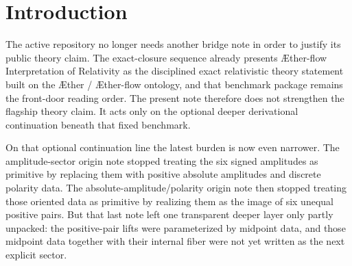 \documentclass[11pt]{article}
\newcommand{\Aether}{\AE{}ther}
\newcommand{\Aflow}{\AE{}ther-flow}
\newcommand{\TheoryName}{\Aflow{} Interpretation of Relativity}
\newcommand{\DeepReadAmp}{\xi_{\mathrm{br}}^{q}}
\newcommand{\DeepCovAmp}{\xi_{\mathrm{br}}^{\varphi}}
\newcommand{\DeepRelaxAmp}{\xi_{\mathrm{br}}^{V}}
\newcommand{\DeepWellAmp}{\zeta_{\mathrm{br}}^{\lambda}}
\newcommand{\DeepEqAmp}{\zeta_{\mathrm{br}}^{U}}
\newcommand{\DeepScaleAmp}{\varsigma_{\mathrm{br}}}
\newcommand{\MidRead}{C_{q}}
\newcommand{\MidCov}{C_{\varphi}}
\newcommand{\MidRelax}{C_{V}}
\newcommand{\MidWell}{C_{\lambda}}
\newcommand{\MidEq}{C_{U}}
\newcommand{\MidScale}{C_{\omega}}
\newcommand{\FiberRead}{\Theta_{q}}
\newcommand{\FiberCov}{\Theta_{\varphi}}
\newcommand{\FiberRelax}{\Theta_{V}}
\newcommand{\FiberWell}{\Theta_{\lambda}}
\newcommand{\FiberEq}{\Theta_{U}}
\newcommand{\FiberScale}{\Theta_{\omega}}
\begin{document}
\begin{abstract}
Using the frozen maps exactly as already recorded, the note then proves four facts. First, the composite map into the signed amplitudes is simply
\[
(\DeepReadAmp,\DeepCovAmp,\DeepRelaxAmp,\DeepWellAmp,\DeepEqAmp,\DeepScaleAmp)
=
(2\MidRead\FiberRead,2\MidCov\FiberCov,2\MidRelax\FiberRelax,2\MidWell\FiberWell,2\MidEq\FiberEq,2\MidScale\FiberScale).
\]
Second, the same primitive class, the same readout block, the same ordered kinetic pair, the same radial anchor pair, and the same positive orbit modulus are recovered exactly by squaring those signed products. Third, the same raw-orbit lift, the same density/current block, the same primitive bridge-order block, the same phase-neutral minimizing branch, the same canonical profile, and the same dressed bridge map are recovered unchanged. Fourth, the only new relation visible at this level is the internal midpoint/fiber relation that keeps the six oriented products \(2C\Theta\) fixed. That relation does not identify distinct positive moduli and it introduces no vacuum-angle locking or angle quotient. Therefore the disciplined current verdict remains unchanged: the positive scale orbit is still a canonical-normalization orbit rather than a proved redundancy, and the global \(O(2)\) vacuum angle remains residual.

The scope is deliberately narrow. This note does not claim that the midpoint/fiber sector is the final unique substrate microphysics. Its narrower positive result is that the previously implicit midpoint layer and its internal fiber are now written explicitly, constrained sharply, and shown to preserve the already-positive downstream package exactly.
\end{abstract}

\section{Introduction}

The active repository no longer needs another bridge note in order to justify its public theory claim. The exact-closure sequence already presents \TheoryName{} as the disciplined exact relativistic theory statement built on the \Aether{} / \Aflow{} ontology, and that benchmark package remains the front-door reading order. The present note therefore does not strengthen the flagship theory claim. It acts only on the optional deeper derivational continuation beneath that fixed benchmark.

On that optional continuation line the latest burden is now even narrower. The amplitude-sector origin note stopped treating the six signed amplitudes as primitive by replacing them with positive absolute amplitudes and discrete polarity data. The absolute-amplitude/polarity origin note then stopped treating those oriented data as primitive by realizing them as the image of six unequal positive pairs. But that last note left one transparent deeper layer only partly unpacked: the positive-pair lifts were parameterized by midpoint data, and those midpoint data together with their internal fiber were not yet written as the next explicit sector.
\end{document}
